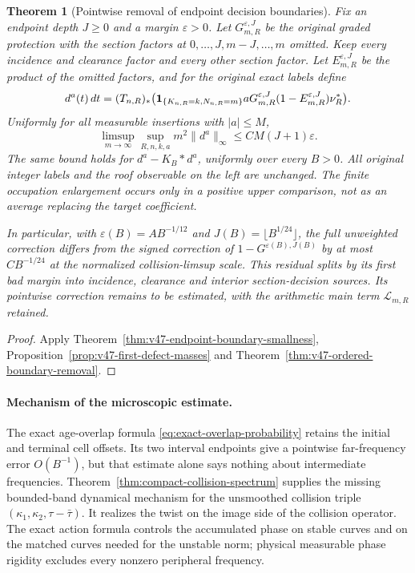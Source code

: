 \documentclass[11pt,reqno]{amsart}
\numberwithin{equation}{section}
\newtheorem{leadtheorem}{Theorem}
\theoremstyle{definition}\newtheorem{definition}[theorem]{Definition}
\theoremstyle{remark}\newtheorem{remark}[theorem]{Remark}
\begin{document}
\begin{leadtheorem}[Pointwise removal of endpoint decision boundaries]
\label{thm:intro-v47-boundary-decisions}
Fix an endpoint depth $J\ge0$ and a margin $\varepsilon>0$. Let
$G^{\varepsilon,J}_{m,R}$ be the original graded protection with the
section factors at $0,\ldots,J,m-J,\ldots,m$ omitted. Keep every
incidence and clearance factor and every other section factor. Let
$E^{\varepsilon,J}_{m,R}$ be the product of the omitted factors, and
for the original exact labels define
\[
 d^a(t)\,dt=(T_{n,R})_*
 \bigl(\mathbf1_{\{K_{n,R}=k,N_{n,R}=m\}}
       aG^{\varepsilon,J}_{m,R}(1-E^{\varepsilon,J}_{m,R})\nu_R^*\bigr).
\]
Uniformly for all measurable insertions with $|a|\le M$,
\[
 \limsup_{m\to\infty}\sup_{R,n,k,a}m^2\|d^a\|_\infty
       \le CM(J+1)\varepsilon.
\]
The same bound holds for $d^a-K_B*d^a$, uniformly over every $B>0$.
All original integer labels and the roof observable on the left are
unchanged. The finite occupation enlargement occurs only in a positive
upper comparison, not as an average replacing the target coefficient.

In particular, with $\varepsilon(B)=AB^{-1/12}$ and
$J(B)=\lfloor B^{1/24}\rfloor$, the full unweighted correction differs
from the signed correction of $1-G^{\varepsilon(B),J(B)}$ by at most
$CB^{-1/24}$ at the normalized collision-limsup scale. This residual
splits by its first bad margin into incidence, clearance and interior
section-decision sources. Its pointwise correction remains to be
estimated, with the arithmetic main term $\mathcal L_{m,R}$ retained.
\end{leadtheorem}
\begin{proof}
Apply Theorem~\ref{thm:v47-endpoint-boundary-smallness},
Proposition~\ref{prop:v47-first-defect-masses} and
Theorem~\ref{thm:v47-ordered-boundary-removal}.
\end{proof}

\paragraph{Mechanism of the microscopic estimate.}
The exact age-overlap formula
\eqref{eq:exact-overlap-probability} retains the initial and terminal
cell offsets. Its two interval endpoints give a pointwise far-frequency
error $O(B^{-1})$, but that estimate alone says nothing about intermediate
frequencies. Theorem~\ref{thm:compact-collision-spectrum} supplies the
missing bounded-band dynamical mechanism for the unsmoothed collision
triple $(\kappa_1,\kappa_2,\tau-\bar\tau)$. It realizes the twist on
the image side of the collision operator. The exact action formula
controls the accumulated phase on stable curves and on the matched
curves needed for the unstable norm; physical measurable phase rigidity
excludes every nonzero peripheral frequency.
\end{document}
